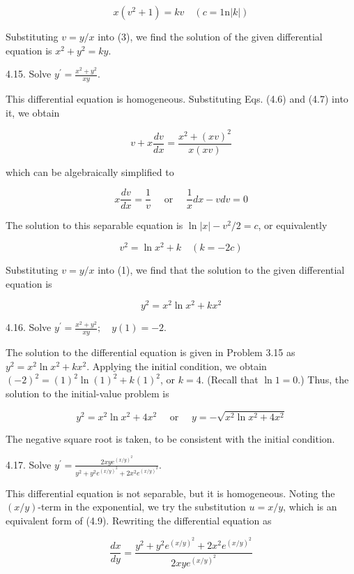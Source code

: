 \documentclass[10pt]{article}
\begin{document}
\begin{equation*}
x\left(v^{2}+1\right)=k v \quad(c=1 \mathrm{n}|k|) \tag{3}
\end{equation*}


Substituting $v=y / x$ into (3), we find the solution of the given differential equation is $x^{2}+y^{2}=k y$.

4.15. Solve $y^{\prime}=\frac{x^{2}+y^{2}}{x y}$.

This differential equation is homogeneous. Substituting Eqs. (4.6) and (4.7) into it, we obtain

$$
v+x \frac{d v}{d x}=\frac{x^{2}+(x v)^{2}}{x(x v)}
$$

which can be algebraically simplified to

$$
x \frac{d v}{d x}=\frac{1}{v} \quad \text { or } \quad \frac{1}{x} d x-v d v=0
$$

The solution to this separable equation is $\ln |x|-v^{2} / 2=c$, or equivalently


\begin{equation*}
v^{2}=\ln x^{2}+k \quad(k=-2 c) \tag{1}
\end{equation*}


Substituting $v=y / x$ into (1), we find that the solution to the given differential equation is

$$
y^{2}=x^{2} \ln x^{2}+k x^{2}
$$

4.16. Solve $y^{\prime}=\frac{x^{2}+y^{2}}{x y} ; \quad y(1)=-2$.

The solution to the differential equation is given in Problem 3.15 as $y^{2}=x^{2} \ln x^{2}+k x^{2}$. Applying the initial condition, we obtain $(-2)^{2}=(1)^{2} \ln (1)^{2}+k(1)^{2}$, or $k=4$. (Recall that $\ln 1=0$.) Thus, the solution to the initial-value problem is

$$
y^{2}=x^{2} \ln x^{2}+4 x^{2} \quad \text { or } \quad y=-\sqrt{x^{2} \ln x^{2}+4 x^{2}}
$$

The negative square root is taken, to be consistent with the initial condition.

4.17. Solve $y^{\prime}=\frac{2 x y e^{(x / y)^{2}}}{y^{2}+y^{2} e^{(x / y)^{2}}+2 x^{2} e^{(x / y)^{2}}}$.

This differential equation is not separable, but it is homogeneous. Noting the $(x / y)$-term in the exponential, we try the substitution $u=x / y$, which is an equivalent form of (4.9). Rewriting the differential equation as

$$
\frac{d x}{d y}=\frac{y^{2}+y^{2} e^{(x / y)^{2}}+2 x^{2} e^{(x / y)^{2}}}{2 x y e^{(x / y)^{2}}}
$$
\end{document}

